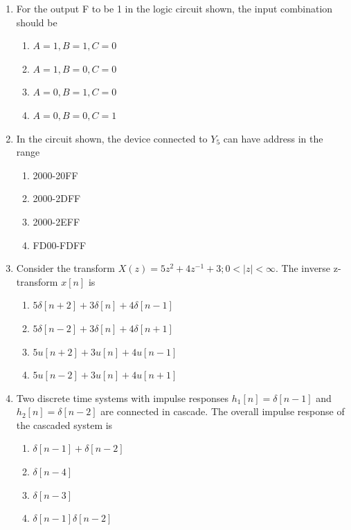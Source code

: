 \documentclass[journal,12pt,onecolumn]{IEEEtran}
\begin{document}
\begin{enumerate}
\item For the output F to be 1 in the logic circuit shown, the input combination should be
\begin{multicols}{2}
\begin{enumerate}
\item $A=1, B=1, C=0$
\item $A=1, B=0, C=0$
\item $A=0, B=1, C=0$
\item $A=0, B=0, C=1$
\end{enumerate}
\end{multicols}

\item In the circuit shown, the device connected to $Y_5$ can have address in the range
\begin{multicols}{2}
\begin{enumerate}
\item 2000-20FF
\item 2000-2DFF
\item 2000-2EFF
\item FD00-FDFF
\end{enumerate}
\end{multicols}

\item Consider the transform $X(z)=5z^2+4z^{-1}+3; 0<|z|<\infty$. The inverse z-transform $x[n]$ is
\begin{multicols}{2}
\begin{enumerate}
\item $5\delta[n+2]+3\delta[n]+4\delta[n-1]$
\item $5\delta[n-2]+3\delta[n]+4\delta[n+1]$
\item $5u[n+2]+3u[n]+4u[n-1]$
\item $5u[n-2]+3u[n]+4u[n+1]$
\end{enumerate}
\end{multicols}

\item Two discrete time systems with impulse responses $h_1[n]=\delta[n-1]$ and $h_2[n]=\delta[n-2]$ are connected in cascade. The overall impulse response of the cascaded system is
\begin{multicols}{2}
\begin{enumerate}
\item $\delta[n-1]+\delta[n-2]$
\item $\delta[n-4]$
\item $\delta[n-3]$
\item $\delta[n-1]\delta[n-2]$
\end{enumerate}
\end{multicols}


\end{enumerate}
\end{document}
